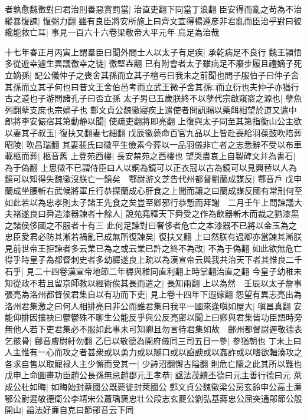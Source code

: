 者孰愈魏徵對曰君治則善惡賞罰當|{
	治直吏翻下同當丁浪翻}
臣安得而亂之苟為不治縱暴愎諫|{
	愎弼力翻}
雖有良臣將安所施上曰齊文宣得楊遵彦非君亂而臣治乎對曰彼纔能救亡耳|{
	事見一百六十六卷梁敬帝大平元年}
烏足為治哉

十七年春正月丙寅上謂羣臣曰聞外間士人以太子有足疾|{
	承乾病足不良行}
魏王頴悟多從遊幸遽生異議徼幸之徒|{
	徼堅壵翻}
已有附會者太子雖病足不廢步履且禮嫡子死立嫡孫|{
	記公儀仲子之喪舍其孫而立其子檀弓曰我未之前聞也問子服伯子曰仲子舍其孫而立其子何也曰昔文王舍伯邑考而立武王微子舍其孫□而立衍也夫仲子亦猶行古之道也子游問諸孔子曰否立孫}
太子男已五歲朕終不以孽代宗啟窺窬之源也|{
	孽魚列翻孽支庶也宗嫡子也}
鄭文貞公魏徵寢疾上遣使者問訊賜以藥餌相望於道又遣中郎將李安儼宿其第動静以聞|{
	使疏吏翻將即亮翻}
上復與太子同至其第指衡山公主欲以妻其子叔玉|{
	復扶又翻妻七細翻}
戊辰徵薨命百官九品以上皆赴喪給羽葆鼓吹陪葬昭陵|{
	吹昌瑞翻}
其妻裴氏曰徵平生儉素今葬以一品羽儀非亡者之志悉辭不受以布車載柩而葬|{
	柩音舊}
上登苑西樓|{
	長安禁苑之西樓也}
望哭盡哀上自製碑文并為書石|{
	為于偽翻}
上思徵不已謂侍臣曰人以銅為鏡可以正衣冠以古為鏡可以見興替以人為鏡可以知得失魏徵沒朕亡一鏡矣　鄠尉游文芝告代州都督劉蘭成謀反|{
	鄠音戶}
戊申蘭成坐腰斬右武候將軍丘行恭探蘭成心肝食之上聞而讓之曰蘭成謀反國有常刑何至如此若以為忠孝則太子諸王先食之矣豈至卿邪行恭慙而拜謝　二月壬午上問諫議大夫褚遂良曰舜造漆器諫者十餘人|{
	說苑堯釋天下舜受之作為飲器斬木而裁之猶漆黑之諸侯侈國之不服者十有三}
此何足諫對曰奢侈者危亡之本漆器不已將以金玉為之忠臣愛君必防其漸若禍亂已成無所復諫矣|{
	復扶又翻}
上曰然朕有過卿亦當諫其漸朕見前世帝王拒諫者多云業已為之或云業已許之終不為改|{
	不為于偽翻}
如此欲無危亡得乎時皇子為都督刺史者多幼稺遂良上疏以為漢宣帝云與我共治天下者其惟良二千石乎|{
	見二十四卷漢宣帝地節二年稺與稚同直利翻上時掌翻治直之翻}
今皇子幼稚未知從政不若且留京師教以經術俟其長而遣之|{
	長知兩翻}
上以為然　壬辰以太子詹事張亮為洛州都督侯君集自以有功而下吏|{
	見上卷十四年下遐嫁翻}
怨望有異志亮出為洛州君集激之曰何人相排亮曰非公而誰君集曰我平一國來逢嗔如屋大|{
	嗔昌真翻}
安能仰排因攘袂曰鬱鬱殊不聊生公能反乎與公反亮密以聞上曰卿與君集皆功臣語時旁無他人若下吏君集必不服如此事未可知卿且勿言待君集如故　鄜州都督尉遲敬德表乞骸骨|{
	鄜音膚尉紆勿翻}
乙巳以敬德為開府儀同三司五日一參|{
	參猶朝也}
丁未上曰人主惟有一心而攻之者甚衆或以勇力或以辯口或以諂諛或以姦詐或以嗜欲輻湊攻之各求自售以取寵禄人主少懈而受其一|{
	少詩沼翻懈古隘翻}
則危亡隨之此其所以難也　戊申上命圖畫功臣趙公長孫無忌趙郡元王孝恭|{
	諡法茂績丕德曰元主善行德曰元}
萊成公杜如晦|{
	如晦始封蔡國公既薨徙封萊國公}
鄭文貞公魏徵梁公房玄齡申公高士亷鄂公尉遲敬德衛公李靖宋公蕭瑀褒忠壮公段志玄夔公劉弘基蔣忠公屈突通鄖節公殷開山|{
	謚法好亷自克曰節鄖音云下同}
